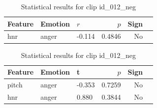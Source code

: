 \begin{table}[ht]
    \centering
    \begin{subtable}[t]{0.48\textwidth}
      \centering
      \caption{Clip id\_012\_neg – Pearson Correlation}
      \label{tab:clip012_pearson}
      \begin{tabular}{lllrrl}
        \toprule
        Feature               & Emotion & $r$ & $p$ & Sign \\
        \midrule
        hnr          & anger   & -0.114 & 0.4846 & No \\
        \bottomrule
      \end{tabular}
    \end{subtable}
    \hfill
    \begin{subtable}[t]{0.48\textwidth}
      \centering
      \caption{Clip id\_012\_neg – t-test}
      \label{tab:clip012_ttest}
      \begin{tabular}{lllrrl}
        \toprule
        Feature               & Emotion & t & $p$& Sign \\
        \midrule
        pitch        & anger   & -0.353 & 0.7259 & No \\
        hnr          & anger   &  0.880 & 0.3844 & No \\
        \bottomrule
      \end{tabular}
    \end{subtable}
    \caption{Statistical results for clip id\_012\_neg}
    \label{tab:clip012_stats}
  \end{table}

